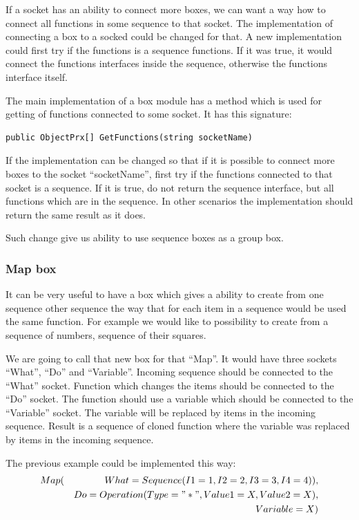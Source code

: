 \documentclass[a4paper,12pt]{book}
\begin{document}
If a socket has an ability to connect more boxes, we can want a way how to connect all functions in some sequence to that socket. The implementation of connecting a box to a socked could be changed for that. A new implementation could first try if the functions is a sequence functions. If it was true, it would connect the functions interfaces inside the sequence, otherwise the functions interface itself.

The main implementation of a box module has a method which is used for getting of functions connected to some socket. It has this signature:
\begin{verbatim}
public ObjectPrx[] GetFunctions(string socketName)
\end{verbatim}

If the implementation can be changed so that if it is possible to connect more boxes to the socket ``socketName'', first try if the functions connected to that socket is a sequence. If it is true, do not return the sequence interface, but all functions which are in the sequence. In other scenarios the implementation should return the same result as it does.

Such change give us ability to use sequence boxes as a group box.

\subsubsection{Map box}
It can be very useful to have a box which gives a ability to create from one sequence other sequence the way that for each item in a sequence would be used the same function. For example we would like to possibility to create from a sequence of numbers, sequence of their squares. 

We are going to call that new box for that ``Map''. It would have three sockets ``What'', ``Do'' and ``Variable''. Incoming sequence should be connected to the ``What'' socket. Function which changes the items should be connected to the ``Do'' socket. The function should use a variable which should be connected to the ``Variable'' socket. The variable will be replaced by items in the incoming sequence. Result is a sequence of cloned function where the variable was replaced by items in the incoming sequence.

The previous example could be implemented this way:
\begin{eqnarray*}
Map(&&What=Sequence(I1=1,I2=2,I3=3,I4=4)), \\&& Do=Operation(Type="*", Value1=X, Value2=X), \\&& Variable=X)
\end{eqnarray*}
\end{document}

